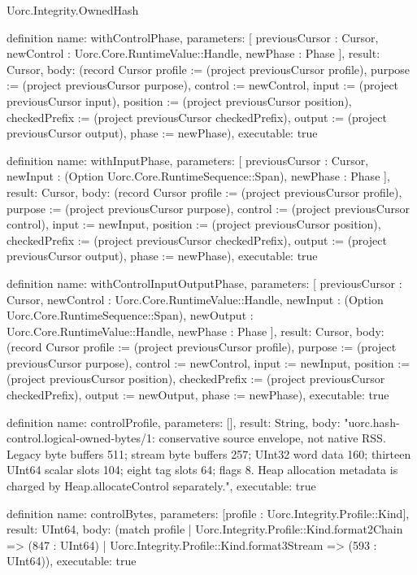 \begin{lexlean}{Uorc.Integrity.OwnedHash}
\begin{semanticmodule}
definition{
  name: withControlPhase,
  parameters: [
    previousCursor : Cursor,
    newControl : Uorc.Core.RuntimeValue::Handle,
    newPhase : Phase
  ],
  result: Cursor,
  body: (record Cursor {profile := (project previousCursor profile), purpose := (project previousCursor purpose), control := newControl, input := (project previousCursor input), position := (project previousCursor position), checkedPrefix := (project previousCursor checkedPrefix), output := (project previousCursor output), phase := newPhase}),
  executable: true
}

definition{
  name: withInputPhase,
  parameters: [
    previousCursor : Cursor,
    newInput : (Option Uorc.Core.RuntimeSequence::Span),
    newPhase : Phase
  ],
  result: Cursor,
  body: (record Cursor {profile := (project previousCursor profile), purpose := (project previousCursor purpose), control := (project previousCursor control), input := newInput, position := (project previousCursor position), checkedPrefix := (project previousCursor checkedPrefix), output := (project previousCursor output), phase := newPhase}),
  executable: true
}

definition{
  name: withControlInputOutputPhase,
  parameters: [
    previousCursor : Cursor,
    newControl : Uorc.Core.RuntimeValue::Handle,
    newInput : (Option Uorc.Core.RuntimeSequence::Span),
    newOutput : Uorc.Core.RuntimeValue::Handle,
    newPhase : Phase
  ],
  result: Cursor,
  body: (record Cursor {profile := (project previousCursor profile), purpose := (project previousCursor purpose), control := newControl, input := newInput, position := (project previousCursor position), checkedPrefix := (project previousCursor checkedPrefix), output := newOutput, phase := newPhase}),
  executable: true
}

definition{
  name: controlProfile,
  parameters: [],
  result: String,
  body: "uorc.hash-control.logical-owned-bytes/1: conservative source envelope, not native RSS. Legacy byte buffers 511; stream byte buffers 257; UInt32 word data 160; thirteen UInt64 scalar slots 104; eight tag slots 64; flags 8. Heap allocation metadata is charged by Heap.allocateControl separately.",
  executable: true
}

definition{
  name: controlBytes,
  parameters: [profile : Uorc.Integrity.Profile::Kind],
  result: UInt64,
  body: (match profile
    | Uorc.Integrity.Profile::Kind.format2Chain => (847 : UInt64)
    | Uorc.Integrity.Profile::Kind.format3Stream => (593 : UInt64)),
  executable: true
}


\end{semanticmodule}
\end{lexlean}
